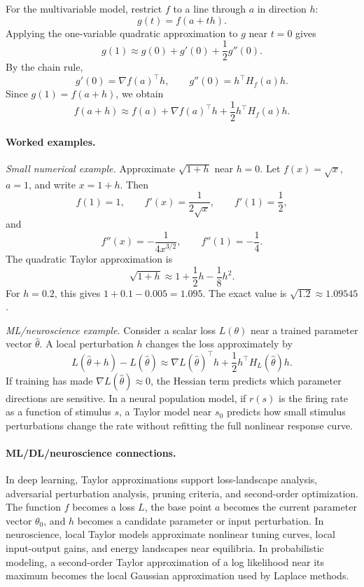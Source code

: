 For the multivariable model, restrict \(f\) to a line through \(a\) in direction \(h\):
\[
g(t)=f(a+t h).
\]
Applying the one-variable quadratic approximation to \(g\) near \(t=0\) gives
\[
g(1)\approx g(0)+g'(0)+\frac{1}{2}g''(0).
\]
By the chain rule,
\[
g'(0)=\nabla f(a)^\top h,
\qquad
g''(0)=h^\top H_f(a)h.
\]
Since \(g(1)=f(a+h)\), we obtain
\[
f(a+h)\approx f(a)+\nabla f(a)^\top h+\frac{1}{2}h^\top H_f(a)h.
\]

\paragraph{Worked examples.}
\emph{Small numerical example.} Approximate \(\sqrt{1+h}\) near \(h=0\). Let \(f(x)=\sqrt{x}\), \(a=1\), and write \(x=1+h\). Then
\[
f(1)=1,\qquad f'(x)=\frac{1}{2\sqrt{x}},\qquad f'(1)=\frac{1}{2},
\]
and
\[
f''(x)=-\frac{1}{4x^{3/2}},
\qquad
f''(1)=-\frac{1}{4}.
\]
The quadratic Taylor approximation is
\[
\sqrt{1+h}\approx 1+\frac{1}{2}h-\frac{1}{8}h^2.
\]
For \(h=0.2\), this gives \(1+0.1-0.005=1.095\). The exact value is \(\sqrt{1.2}\approx1.09545\).

\emph{ML/neuroscience example.} Consider a scalar loss \(L(\theta)\) near a trained parameter vector \(\hat{\theta}\). A local perturbation \(h\) changes the loss approximately by
\[
L(\hat{\theta}+h)-L(\hat{\theta})
\approx
\nabla L(\hat{\theta})^\top h+\frac{1}{2}h^\top H_L(\hat{\theta})h.
\]
If training has made \(\nabla L(\hat{\theta})\approx0\), the Hessian term predicts which parameter directions are sensitive. In a neural population model, if \(r(s)\) is the firing rate as a function of stimulus \(s\), a Taylor model near \(s_0\) predicts how small stimulus perturbations change the rate without refitting the full nonlinear response curve.

\paragraph{ML/DL/neuroscience connections.}
In deep learning, Taylor approximations support loss-landscape analysis, adversarial perturbation analysis, pruning criteria, and second-order optimization. The function \(f\) becomes a loss \(L\), the base point \(a\) becomes the current parameter vector \(\theta_0\), and \(h\) becomes a candidate parameter or input perturbation. In neuroscience, local Taylor models approximate nonlinear tuning curves, local input-output gains, and energy landscapes near equilibria. In probabilistic modeling, a second-order Taylor approximation of a log likelihood near its maximum becomes the local Gaussian approximation used by Laplace methods.

